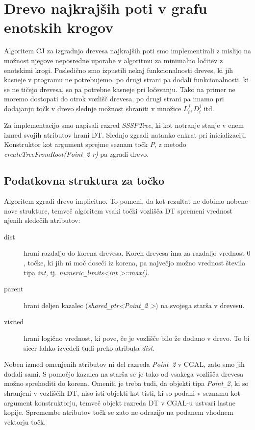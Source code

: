 \documentclass[a4paper, 12pt]{book}
\newcommand{\U}{\texttt{\_}}
\begin{document}
\section{Drevo najkrajših poti v grafu enotskih krogov}

Algoritem CJ za izgradnjo drevesa najkrajših poti smo implementirali z mislijo na možnost njegove neposredne uporabe v algoritmu za minimalno ločitev z enotskimi krogi. Posledično smo izpustili nekaj funkcionalnosti dreves, ki jih kasneje v programu ne potrebujemo, po drugi strani pa dodali funkcionalnosti, ki se ne tičejo drevesa, so pa potrebne kasneje pri ločevanju. Tako na primer ne moremo dostopati do otrok vozlišč drevesa, po drugi strani pa imamo pri dodajanju točk v drevo slednje možnost shraniti v množice $L_i^j, D_i^j$ itd.

Za implementacijo smo napisali razred \textit{SSSPTree}, ki kot notranje stanje v enem izmed svojih atributov hrani DT. Slednjo zgradi natanko enkrat pri inicializaciji. Konstruktor kot argument sprejme seznam točk $P$, z metodo \textit{createTreeFromRoot(Point\U 2 r)} pa zgradi drevo.

\subsection{Podatkovna struktura za točko}
\label{point-refs}
Algoritem zgradi drevo implicitno. To pomeni, da kot rezultat ne dobimo nobene nove strukture, temveč algoritem vsaki točki vozlišča DT spremeni vrednost njenih sledečih atributov:

\begin{description}
\item[dist] hrani razdaljo do korena drevesa. Koren drevesa ima za razdaljo vrednost $0$, točke, ki jih ni moč doseči iz korena, pa največjo možno vrednost števila tipa \textit{int}, tj. \textit{numeric\U limits\textless int \textgreater ::max()}.
\item[parent] hrani deljen kazalec (\textit{shared\U ptr\textless Point\U 2 \textgreater}) na svojega starša v drevesu.
\item[visited] hrani logično vrednost, ki pove, če je vozlišče bilo že dodano v drevo. To bi sicer lahko izvedeli tudi preko atributa \textit{dist}.
\end{description}

Noben izmed omenjenih atributov ni del razreda \textit{Point\U 2} v CGAL, zato smo jih dodali sami. S pomočjo kazalca na starša se je tako od vsakega vozlišča drevesa možno sprehoditi do korena. Omeniti je treba tudi, da objekti tipa \textit{Point\U 2}, ki so shranjeni v vozliščih DT, niso isti objekti kot tisti, ki so podani v seznamu kot argument konstruktorju, temveč objekt razreda DT v CGAL-u ustvari lastne kopije. Spremembe atributov točk se zato ne odrazijo na podanem vhodnem vektorju točk. 
\end{document}
